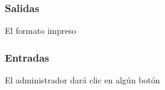
\subsubsection{Salidas}
	\begin{Citemize}
		\item El formato impreso %
	\end{Citemize}
	
\subsubsection{Entradas}
	\begin{Citemize}
		\item El administrador dará clic en algún botón 
	\end{Citemize}